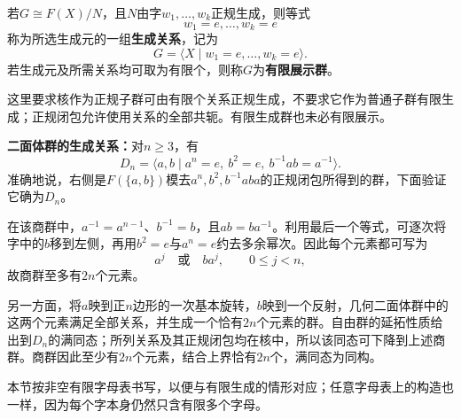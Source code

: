 \begin{definition}
若$G\cong F(X)/N$，且$N$由字$w_1,\ldots,w_k$正规生成，则等式
\[
w_1=e,\ldots,w_k=e
\]
称为所选生成元的一组\textbf{生成关系}，记为
\[
G=\langle X\mid w_1=e,\ldots,w_k=e\rangle.
\]
若生成元及所需关系均可取为有限个，则称$G$为\textbf{有限展示群}。
\end{definition}

这里要求核作为正规子群可由有限个关系正规生成，不要求它作为普通子群有限生成；正规闭包允许使用关系的全部共轭。有限生成群也未必有限展示。

\begin{example}
\textbf{二面体群的生成关系：}对$n\geq3$，有
\[
D_n=\langle a,b\mid a^n=e,\ b^2=e,\ b^{-1}ab=a^{-1}\rangle.
\]
准确地说，右侧是$F(\{a,b\})$模去$a^n,b^2,b^{-1}aba$的正规闭包所得到的群，下面验证它确为$D_n$。

在该商群中，$a^{-1}=a^{n-1}$、$b^{-1}=b$，且$ab=ba^{-1}$。利用最后一个等式，可逐次将字中的$b$移到左侧，再用$b^2=e$与$a^n=e$约去多余幂次。因此每个元素都可写为
\[
a^j\quad\text{或}\quad ba^j,\qquad0\leq j<n,
\]
故商群至多有$2n$个元素。

另一方面，将$a$映到正$n$边形的一次基本旋转，$b$映到一个反射，几何二面体群中的这两个元素满足全部关系，并生成一个恰有$2n$个元素的群。自由群的延拓性质给出到$D_n$的满同态；所列关系及其正规闭包均在核中，所以该同态可下降到上述商群。商群因此至少有$2n$个元素，结合上界恰有$2n$个，满同态为同构。
\end{example}

本节按非空有限字母表书写，以便与有限生成的情形对应；任意字母表上的构造也一样，因为每个字本身仍然只含有限多个字母。
